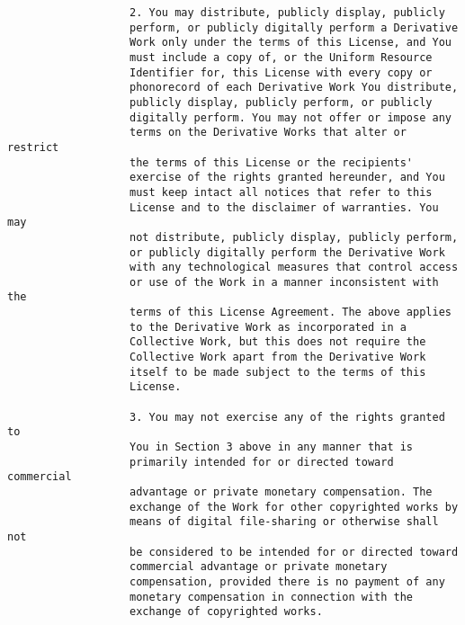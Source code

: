 \begin{verbatim}
                   2. You may distribute, publicly display, publicly
                   perform, or publicly digitally perform a Derivative
                   Work only under the terms of this License, and You
                   must include a copy of, or the Uniform Resource
                   Identifier for, this License with every copy or
                   phonorecord of each Derivative Work You distribute,
                   publicly display, publicly perform, or publicly
                   digitally perform. You may not offer or impose any
                   terms on the Derivative Works that alter or restrict
                   the terms of this License or the recipients'
                   exercise of the rights granted hereunder, and You
                   must keep intact all notices that refer to this
                   License and to the disclaimer of warranties. You may
                   not distribute, publicly display, publicly perform,
                   or publicly digitally perform the Derivative Work
                   with any technological measures that control access
                   or use of the Work in a manner inconsistent with the
                   terms of this License Agreement. The above applies
                   to the Derivative Work as incorporated in a
                   Collective Work, but this does not require the
                   Collective Work apart from the Derivative Work
                   itself to be made subject to the terms of this
                   License.
                
                   3. You may not exercise any of the rights granted to
                   You in Section 3 above in any manner that is
                   primarily intended for or directed toward commercial
                   advantage or private monetary compensation. The
                   exchange of the Work for other copyrighted works by
                   means of digital file-sharing or otherwise shall not
                   be considered to be intended for or directed toward
                   commercial advantage or private monetary
                   compensation, provided there is no payment of any
                   monetary compensation in connection with the
                   exchange of copyrighted works.
                

\end{verbatim}
